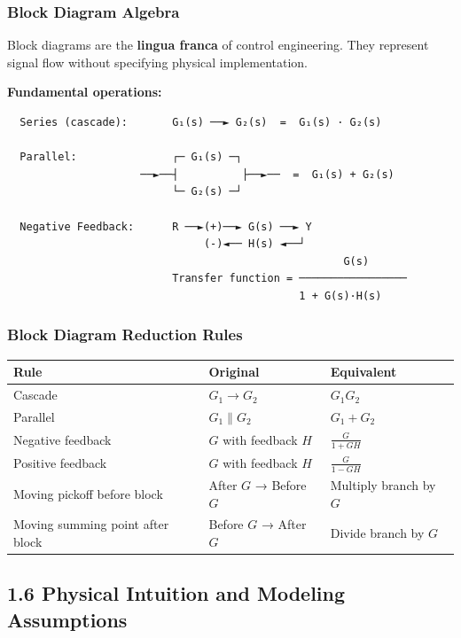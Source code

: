 \documentclass[11pt,a4paper]{book}
\begin{document}
\subsubsection{Block Diagram Algebra}

Block diagrams are the \textbf{lingua franca} of control engineering. They represent signal flow without specifying physical implementation.

\textbf{Fundamental operations:}

\begin{lstlisting}
  Series (cascade):       G₁(s) ──► G₂(s)  =  G₁(s) · G₂(s)

  Parallel:               ┌─ G₁(s) ─┐
                     ──►──┤          ├──►──  =  G₁(s) + G₂(s)
                          └─ G₂(s) ─┘

  Negative Feedback:      R ──►(+)──► G(s) ──► Y
                               (-)◄── H(s) ◄──┘
                                                     G(s)
                          Transfer function = ─────────────────
                                              1 + G(s)·H(s)
\end{lstlisting}

\subsubsection{Block Diagram Reduction Rules}

\begin{center}
\begin{tabular}{|l|l|l|}
\hline
Rule & Original & Equivalent \\
\hline
Cascade & $G_1 \to G_2$ & $G_1 G_2$ \\
Parallel & $G_1 \parallel G_2$ & $G_1 + G_2$ \\
Negative feedback & $G$ with feedback $H$ & $\frac{G}{1+GH}$ \\
Positive feedback & $G$ with feedback $H$ & $\frac{G}{1-GH}$ \\
Moving pickoff before block & After $G$ → Before $G$ & Multiply branch by $G$ \\
Moving summing point after block & Before $G$ → After $G$ & Divide branch by $G$ \\
\hline
\end{tabular}
\end{center}

\medskip\noindent\hrulefill\medskip

\subsection{1.6 Physical Intuition and Modeling Assumptions}
\end{document}
